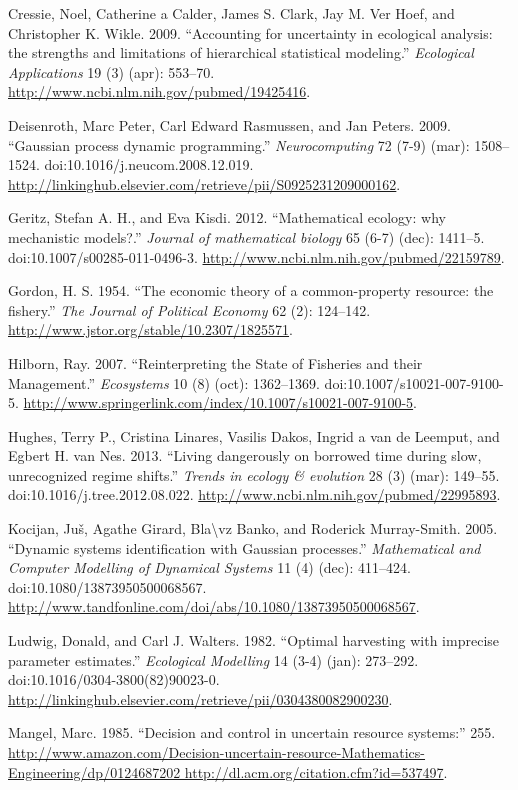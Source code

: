 \documentclass[author-year, review]{elsarticle} %
\begin{document}
Cressie, Noel, Catherine a Calder, James S. Clark, Jay M. Ver Hoef, and
Christopher K. Wikle. 2009. ``Accounting for uncertainty in ecological
analysis: the strengths and limitations of hierarchical statistical
modeling.'' \emph{Ecological Applications} 19 (3) (apr): 553--70.
\url{http://www.ncbi.nlm.nih.gov/pubmed/19425416}.

Deisenroth, Marc Peter, Carl Edward Rasmussen, and Jan Peters. 2009.
``Gaussian process dynamic programming.'' \emph{Neurocomputing} 72 (7-9)
(mar): 1508--1524. doi:10.1016/j.neucom.2008.12.019.
\url{http://linkinghub.elsevier.com/retrieve/pii/S0925231209000162}.

Geritz, Stefan A. H., and Eva Kisdi. 2012. ``Mathematical ecology: why
mechanistic models?.'' \emph{Journal of mathematical biology} 65 (6-7)
(dec): 1411--5. doi:10.1007/s00285-011-0496-3.
\url{http://www.ncbi.nlm.nih.gov/pubmed/22159789}.

Gordon, H. S. 1954. ``The economic theory of a common-property resource:
the fishery.'' \emph{The Journal of Political Economy} 62 (2): 124--142.
\url{http://www.jstor.org/stable/10.2307/1825571}.

Hilborn, Ray. 2007. ``Reinterpreting the State of Fisheries and their
Management.'' \emph{Ecosystems} 10 (8) (oct): 1362--1369.
doi:10.1007/s10021-007-9100-5.
\url{http://www.springerlink.com/index/10.1007/s10021-007-9100-5}.

Hughes, Terry P., Cristina Linares, Vasilis Dakos, Ingrid a van de
Leemput, and Egbert H. van Nes. 2013. ``Living dangerously on borrowed
time during slow, unrecognized regime shifts.'' \emph{Trends in ecology
\& evolution} 28 (3) (mar): 149--55. doi:10.1016/j.tree.2012.08.022.
\url{http://www.ncbi.nlm.nih.gov/pubmed/22995893}.

Kocijan, Juš, Agathe Girard, Bla\textbackslash{}vz Banko, and Roderick
Murray-Smith. 2005. ``Dynamic systems identification with Gaussian
processes.'' \emph{Mathematical and Computer Modelling of Dynamical
Systems} 11 (4) (dec): 411--424. doi:10.1080/13873950500068567.
\url{http://www.tandfonline.com/doi/abs/10.1080/13873950500068567}.

Ludwig, Donald, and Carl J. Walters. 1982. ``Optimal harvesting with
imprecise parameter estimates.'' \emph{Ecological Modelling} 14 (3-4)
(jan): 273--292. doi:10.1016/0304-3800(82)90023-0.
\url{http://linkinghub.elsevier.com/retrieve/pii/0304380082900230}.

Mangel, Marc. 1985. ``Decision and control in uncertain resource
systems:'' 255.
\href{http://www.amazon.com/Decision-uncertain-resource-Mathematics-Engineering/dp/0124687202 http://dl.acm.org/citation.cfm?id=537497}{http://www.amazon.com/Decision-uncertain-resource-Mathematics-Engineering/dp/0124687202
http://dl.acm.org/citation.cfm?id=537497}.
\end{document}
